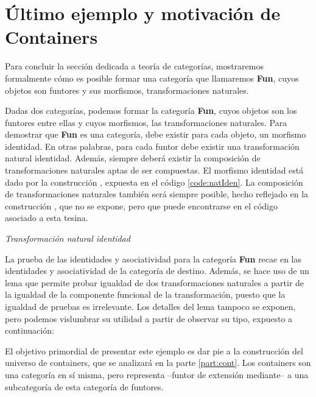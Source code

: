   
\section{Último ejemplo y motivación de Containers}
Para concluir la sección dedicada a teoría de categorías, mostraremos formalmente cómo es posible formar una categoría que llamaremos {\bf Fun}, cuyos objetos son funtores y sus morfismos, transformaciones naturales.

\begin{example}
  

Dadas dos categorías, podemos formar la categoría {\bf Fun}, cuyos objetos son los funtores entre ellas y cuyos morfismos, las transformaciones naturales. Para demostrar que {\bf Fun} es una categoría, debe existir para cada objeto, un morfismo identidad. En otras palabras, para cada funtor debe existir una transformación natural identidad. Además, siempre deberá existir la composición de transformaciones naturales aptas de ser compuestas. El morfismo identidad está dado por la construcción , expuesta en el código \ref{code:natIden}. La composición de transformaciones naturales también será siempre posible, hecho reflejado en la construcción , que no se expone, pero que puede encontrarse en el código asociado a esta tesina.

\begin{agdacode}{\it Transformación natural identidad} \label{code:natIden}

\end{agdacode}

La prueba de las identidades y asociatividad para la categoría {\bf Fun} recae en las identidades y asociatividad de la categoría de destino. Además, se hace uso de un lema que permite probar igualdad de dos transformaciones naturales a partir de la igualdad de la componente funcional de la transformación, puesto que la igualdad de pruebas es irrelevante. Los detalles del lema tampoco se exponen, pero podemos vislumbrar su utilidad a partir de observar su tipo, expuesto a continuación: 


\end{example}


El objetivo primordial de presentar este ejemplo es dar pie a la construcción del universo de containers, que se analizará en la parte \ref{part:cont}. Los containers son una categoría en sí misma, pero representa --funtor de extensión mediante-- a una subcategoría de esta categoría de funtores. %

